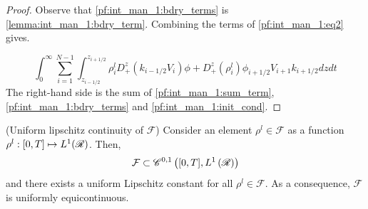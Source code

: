 \begin{proof}
	Observe that \eqref{pf:int_man_1:bdry_terms} is \eqref{lemma:int_man_1:bdry_term}. Combining the terms of \eqref{pf:int_man_1:eq2} gives.
	
	\begin{equation}
		\int_0^{\infty} \sum_{i = 1}^{N-1} \int_{z_{i-1/2}}^{z_{i+1/2}} \rho^l_i D_+^z(k_{i-1/2} V_i
		) \phi +  D^z_+(\rho^l_i) \phi_{i+1/2}V_{i+1}k_{i+1/2} dzdt \label{pf:int_man_1:sum_term}
	\end{equation}
	The right-hand side is the sum of \eqref{pf:int_man_1:sum_term}, \eqref{pf:int_man_1:bdry_terms} and \eqref{pf:int_man_1:init_cond}. 
\end{proof}



\begin{lemma} (Uniform lipschitz continuity of $\mathcal{F}$) \label{lemma:uniform_lip}
	Consider an element $\rho^l \in \mathcal{F}$ as a function $\rho^l : [0,T] \mapsto L^1(\mathscr{R})$. Then, 
	\begin{equation}
		\mathcal{F} \subset \mathscr{C}^{0,1}\left([0,T], L^1\left(\mathscr{R}\right)\right)
	\end{equation}
	and there exists a uniform Lipschitz constant for all $\rho^l \in \mathcal{F}$. As a consequence, $\mathcal{F}$ is uniformly equicontinuous. 
\end{lemma}
